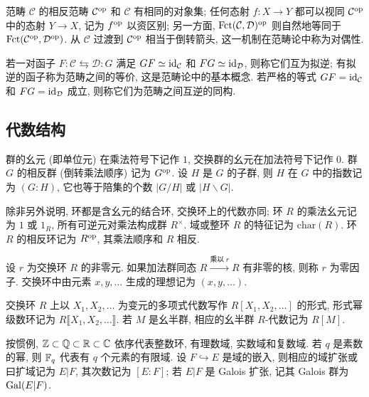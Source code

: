 范畴 $\mathcal{C}$ 的相反范畴 $\mathcal{C}^{\operatorname{op}}$ 和 $\mathcal{C}$ 有相同的对象集; 任何态射 $f: X \to Y$ 都可以视同 $\mathcal{C}^{\operatorname{op}}$ 中的态射 $Y \to X$, 记为 $f^{\operatorname{op}}$ 以资区别; 另一方面, $\mathrm{Fct}(\mathcal{C}, \mathcal{D})^{\operatorname{op}}$ 则自然地等同于 $\mathrm{Fct}(\mathcal{C}^{\operatorname{op}}, \mathcal{D}^{\operatorname{op}})$. 从 $\mathcal{C}$ 过渡到 $\mathcal{C}^{\operatorname{op}}$ 相当于倒转箭头, 这一机制在范畴论中称为对偶性.

若一对函子 $F: \mathcal{C} \leftrightarrows \mathcal{D}: G$ 满足 $GF \simeq \mathrm{id}_{\mathcal{C}}$ 和 $FG \simeq \mathrm{id}_{\mathcal{D}}$, 则称它们互为拟逆; 有拟逆的函子称为范畴之间的等价, 这是范畴论中的基本概念. 若严格的等式 $GF = \mathrm{id}_{\mathcal{C}}$ 和 $FG = \mathrm{id}_{\mathcal{D}}$ 成立, 则称它们为范畴之间互逆的同构.

\subsection*{代数结构}
群的幺元 (即单位元) 在乘法符号下记作 $1$, 交换群的幺元在加法符号下记作 $0$. 群 $G$ 的相反群 (倒转乘法顺序) 记为 $G^{\operatorname{op}}$. 设 $H$ 是 $G$ 的子群, 则 $H$ 在 $G$ 中的指数记为 $(G:H)$, 它也等于陪集的个数 $|G/H|$ 或 $|H \backslash G|$. 

除非另外说明, 环都是含幺元的结合环, 交换环上的代数亦同; 环 $R$ 的乘法幺元记为 $1$ 或 $1_R$, 所有可逆元对乘法构成群 $R^\times$. 域或整环 $R$ 的特征记为 $\mathrm{char}(R)$. 环 $R$ 的相反环记为 $R^{\operatorname{op}}$, 其乘法顺序和 $R$ 相反.

设 $r$ 为交换环 $R$ 的非零元. 如果加法群同态 $R \xrightarrow{\text{乘以}\; r} R$ 有非零的核, 则称 $r$ 为零因子. 交换环中由元素 $x, y, \ldots$ 生成的理想记为 $(x, y, \ldots)$.

交换环 $R$ 上以 $X_1, X_2, \ldots$ 为变元的多项式代数写作 $R[X_1, X_2, \ldots]$ 的形式, 形式幂级数环记为 $R\llbracket X_1, X_2, \ldots \rrbracket$. 若 $M$ 是幺半群, 相应的幺半群 $R$-代数记为 $R[M]$.

按惯例, $\mathbb{Z} \subset \mathbb{Q} \subset \mathbb{R} \subset \mathbb{C}$ 依序代表整数环, 有理数域, 实数域和复数域. 若 $q$ 是素数的幂, 则 $\mathbb{F}_q$ 代表有 $q$ 个元素的有限域. 设 $F \hookrightarrow E$ 是域的嵌入, 则相应的域扩张或曰扩域记为 $E|F$, 其次数记为 $[E:F]$; 若 $E|F$ 是 Galois 扩张, 记其 Galois 群为 $\operatorname{Gal}(E|F)$.


